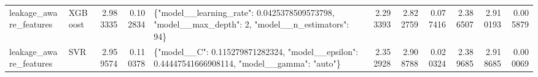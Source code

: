 \begin{tabular}{llrrlrrrrrr}
leakage\_aware\_features & XGBoost & 2.983335 & 0.102834 & \{"model\_\_learning\_rate": 0.0425378509573798, "model\_\_max\_depth": 2, "model\_\_n\_estimators": 94\} & 2.293393 & 2.822759 & 0.077416 & 2.386507 & 2.910193 & 0.005879 \\
leakage\_aware\_features & SVR & 2.959574 & 0.110378 & \{"model\_\_C": 0.115279871282324, "model\_\_epsilon": 0.44447541666908114, "model\_\_gamma": "auto"\} & 2.352928 & 2.908788 & 0.020324 & 2.389685 & 2.918685 & 0.000069 \\
\bottomrule
\end{tabular}
